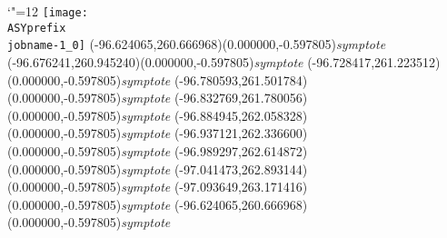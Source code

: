 \setlength{\unitlength}{1pt}%
\makeatletter%
\let\ASYencoding\f@encoding%
\let\ASYfamily\f@family%
\let\ASYseries\f@series%
\let\ASYshape\f@shape%
\makeatother%
{\catcode`"=12%
\texttt{[image: \\ASYprefix\\jobname-1\_0]}%
}%
\color{ASYcolor}%
\fontsize{24.000000}{28.800000}\selectfont%
\usefont{\ASYencoding}{\ASYfamily}{\ASYseries}{\ASYshape}%
\ASYalign(-96.624065,260.666968)(0.000000,-0.597805){{\it symptote}}%
\color{ASYcolor}%
\fontsize{24.000000}{28.800000}\selectfont%
\ASYalign(-96.676241,260.945240)(0.000000,-0.597805){{\it symptote}}%
\color{ASYcolor}%
\fontsize{24.000000}{28.800000}\selectfont%
\ASYalign(-96.728417,261.223512)(0.000000,-0.597805){{\it symptote}}%
\color{ASYcolor}%
\fontsize{24.000000}{28.800000}\selectfont%
\ASYalign(-96.780593,261.501784)(0.000000,-0.597805){{\it symptote}}%
\color{ASYcolor}%
\fontsize{24.000000}{28.800000}\selectfont%
\ASYalign(-96.832769,261.780056)(0.000000,-0.597805){{\it symptote}}%
\color{ASYcolor}%
\fontsize{24.000000}{28.800000}\selectfont%
\ASYalign(-96.884945,262.058328)(0.000000,-0.597805){{\it symptote}}%
\color{ASYcolor}%
\fontsize{24.000000}{28.800000}\selectfont%
\ASYalign(-96.937121,262.336600)(0.000000,-0.597805){{\it symptote}}%
\color{ASYcolor}%
\fontsize{24.000000}{28.800000}\selectfont%
\ASYalign(-96.989297,262.614872)(0.000000,-0.597805){{\it symptote}}%
\color{ASYcolor}%
\fontsize{24.000000}{28.800000}\selectfont%
\ASYalign(-97.041473,262.893144)(0.000000,-0.597805){{\it symptote}}%
\color{ASYcolor}%
\fontsize{24.000000}{28.800000}\selectfont%
\ASYalign(-97.093649,263.171416)(0.000000,-0.597805){{\it symptote}}%
\color{ASYcolor}%
\fontsize{24.000000}{28.800000}\selectfont%
\ASYalign(-96.624065,260.666968)(0.000000,-0.597805){{\it symptote}}%
